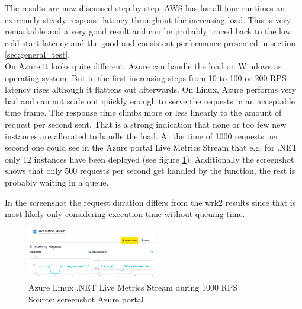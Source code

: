 The results are now discussed step by step. \gls{AWS} has for all four runtimes an extremely steady response latency throughout the increasing load. This is very remarkable and a very good result and can be probably traced back to the low cold start latency and the good and consistent performance presented in section \ref{sec:general_test}.\\
On Azure it looks quite different. Azure can handle the load on Windows as operating system. But in the first increasing steps from 10 to 100 or 200 RPS latency rises although it flattens out afterwards. On Linux, Azure performs very bad and can not scale out quickly enough to serve the requests in an acceptable time frame. The response time climbs more or less linearly to the amount of request per second sent. That is a strong indication that none or too few new instances are allocated to handle the load. At the time of 1000 requests per second one could see in the Azure portal Live Metrics Stream that e.g. for .NET only 12 instances have been deployed (see figure \ref{fig:live_metrics_stream}). Additionally the screenshot shows that only 500 requests per second get handled by the function, the rest is probably waiting in a queue.
\begin{remark}
In the screenshot the request duration differs from the wrk2 results since that is most likely only considering execution time without queuing time.
\end{remark}

\begin{figure}[htp]
\begin{center}
\includegraphics[width=0.5\textwidth]{bilder/Azure_Dotnet_1000.png}
\captionsetup{justification=centering, labelfont=bf}
\caption[Azure Linux .NET Live Metrics Stream during 1000 RPS]{Azure Linux .NET Live Metrics Stream during 1000 RPS\\Source: screenshot Azure portal}
\label{fig:live_metrics_stream}
\end{center}
\end{figure}

